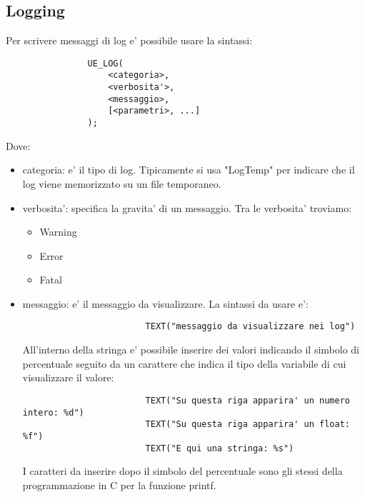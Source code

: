         \subsection{Logging}

            Per scrivere messaggi di log e' possibile usare la sintassi:
            \begin{lstlisting}
                UE_LOG(
                    <categoria>,
                    <verbosita'>,
                    <messaggio>,
                    [<parametri>, ...]
                );
            \end{lstlisting}

            Dove:
            \begin{itemize}
                \item categoria: e' il tipo di log. Tipicamente si usa "LogTemp" per indicare che il log viene memorizzato su un file temporaneo.
                \item verbosita': specifica la gravita' di un messaggio. Tra le verbosita' troviamo:
                    \begin{itemize}
                        \item Warning
                        \item Error
                        \item Fatal
                    \end{itemize}
                \item messaggio: e' il messaggio da visualizzare. La sintassi da usare e':

                    \begin{verbatim}
                        TEXT("messaggio da visualizzare nei log")
                    \end{verbatim}

                    All'interno della stringa e' possibile inserire dei valori indicando il simbolo di percentuale seguito da un carattere che indica il tipo della variabile di cui visualizzare il valore:

                    \begin{verbatim}
                        TEXT("Su questa riga apparira' un numero intero: %d")
                        TEXT("Su questa riga apparira' un float: %f")
                        TEXT("E qui una stringa: %s")
                    \end{verbatim}

                    \begin{notebox}
                        I caratteri da inserire dopo il simbolo del percentuale sono gli stessi della programmazione in C per la funzione printf.
                    \end{notebox}


\end{itemize}
